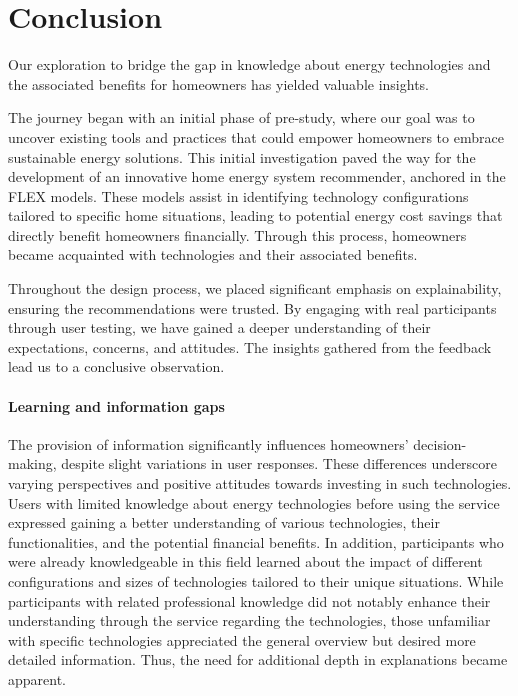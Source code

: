 \chapter{Conclusion}

Our exploration to bridge the gap in knowledge about energy technologies and the associated benefits for homeowners has yielded valuable insights. 

The journey began with an initial phase of pre-study, where our goal was to uncover existing tools and practices that could empower homeowners to embrace sustainable energy solutions. 
This initial investigation paved the way for the development of an innovative home energy system recommender, anchored in the FLEX models. 
These models assist in identifying technology configurations tailored to specific home situations, leading to potential energy cost savings that directly benefit homeowners financially. 
Through this process, homeowners became acquainted with technologies and their associated benefits. 

Throughout the design process, we placed significant emphasis on explainability, ensuring the recommendations were trusted.  
By engaging with real participants through user testing, we have gained a deeper understanding of their expectations, concerns, and attitudes. 
The insights gathered from the feedback lead us to a conclusive observation.


\subsubsection*{Learning and information gaps}

The provision of information significantly influences homeowners' decision-making, despite slight variations in user responses. 
These differences underscore varying perspectives and positive attitudes towards investing in such technologies. 
Users with limited knowledge about energy technologies before using the service expressed gaining a better understanding of various technologies, their functionalities, and the potential financial benefits.
In addition, participants who were already knowledgeable in this field learned about the impact of different configurations and sizes of technologies tailored to their unique situations. 
While participants with related professional knowledge did not notably enhance their understanding through the service regarding the technologies, those unfamiliar with specific technologies appreciated the general overview but desired more detailed information. 
Thus, the need for additional depth in explanations became apparent.

